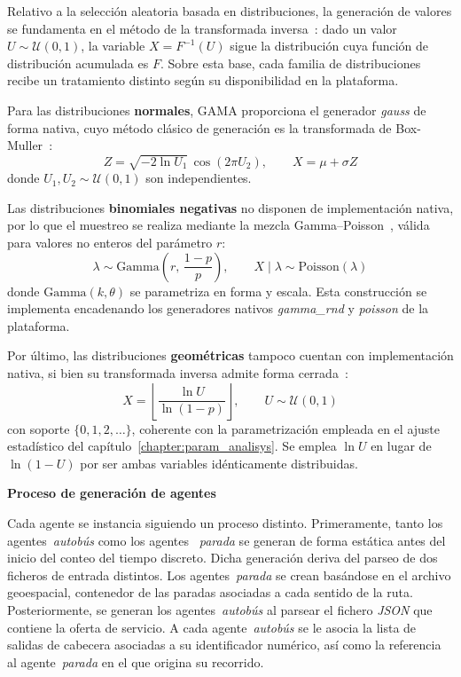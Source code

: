 Relativo a la selección aleatoria basada en distribuciones, la generación de valores
se fundamenta en el método de la transformada inversa~\cite{devroye1986}: dado un
valor $U \sim \mathcal{U}(0,1)$, la variable $X = F^{-1}(U)$ sigue la distribución
cuya función de distribución acumulada es $F$. Sobre esta base, cada familia de
distribuciones recibe un tratamiento distinto según su disponibilidad en la plataforma.

Para las distribuciones \textbf{normales}, GAMA proporciona el generador \textit{gauss}
de forma nativa, cuyo método clásico de generación es la transformada de
Box-Muller~\cite{box1958}:
\begin{equation}
    Z = \sqrt{-2\ln U_1}\,\cos(2\pi U_2), \qquad X = \mu + \sigma Z
    \label{eq:box_muller}
\end{equation}
donde $U_1, U_2 \sim \mathcal{U}(0,1)$ son independientes.

Las distribuciones \textbf{binomiales negativas} no disponen de implementación nativa,
por lo que el muestreo se realiza mediante la mezcla
Gamma--Poisson~\cite{devroye1986}, válida para valores no enteros del parámetro $r$:
\begin{equation}
    \lambda \sim \mathrm{Gamma}\!\left(r,\, \frac{1-p}{p}\right), \qquad
    X \mid \lambda \sim \mathrm{Poisson}(\lambda)
    \label{eq:gamma_poisson}
\end{equation}
donde $\mathrm{Gamma}(k,\theta)$ se parametriza en forma y escala. Esta construcción
se implementa encadenando los generadores nativos \textit{gamma\_rnd} y
\textit{poisson} de la plataforma.

Por último, las distribuciones \textbf{geométricas} tampoco cuentan con implementación
nativa, si bien su transformada inversa admite forma cerrada~\cite{devroye1986}:
\begin{equation}
    X = \left\lfloor \frac{\ln U}{\ln(1-p)} \right\rfloor, \qquad U \sim \mathcal{U}(0,1)
    \label{eq:inv_geometrica}
\end{equation}
con soporte $\{0, 1, 2, \dots\}$, coherente con la parametrización empleada en el
ajuste estadístico del capítulo~\ref{chapter:param_analisys}. Se emplea $\ln U$ en
lugar de $\ln(1-U)$ por ser ambas variables idénticamente distribuidas.

\medskip
\noindent\textbf{Proceso de generación de agentes}

Cada agente se instancia siguiendo un proceso distinto. Primeramente, tanto los agentes~\textit{autobús} como los agentes~\textit{
parada} se generan de forma estática antes del inicio del conteo del tiempo discreto. Dicha generación deriva del parseo de 
dos ficheros de entrada distintos. Los agentes~\textit{parada} se crean basándose en el archivo geoespacial, contenedor de 
las paradas asociadas a cada sentido de la ruta. Posteriormente, se generan los agentes~\textit{autobús} al parsear
el fichero \textit{JSON} que contiene la oferta de servicio. A cada agente~\textit{autobús} se le asocia la lista de 
salidas de cabecera asociadas a su identificador numérico, así como la referencia al agente~\textit{parada} en el que origina
su recorrido.

